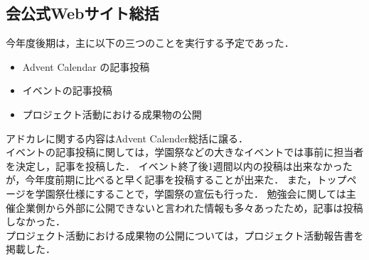 \subsection*{会公式Webサイト総括}


今年度後期は，主に以下の三つのことを実行する予定であった．
\begin{itemize}
  \item Advent Calendar の記事投稿
  \item イベントの記事投稿
  \item プロジェクト活動における成果物の公開
\end{itemize}
アドカレに関する内容はAdvent Calender総括に譲る．\\

イベントの記事投稿に関しては，学園祭などの大きなイベントでは事前に担当者を決定し，記事を投稿した．
イベント終了後1週間以内の投稿は出来なかったが，今年度前期に比べると早く記事を投稿することが出来た．
また，トップページを学園祭仕様にすることで，学園祭の宣伝も行った．
勉強会に関しては主催企業側から外部に公開できないと言われた情報も多々あったため，記事は投稿しなかった．\\

プロジェクト活動における成果物の公開については，プロジェクト活動報告書を掲載した．
